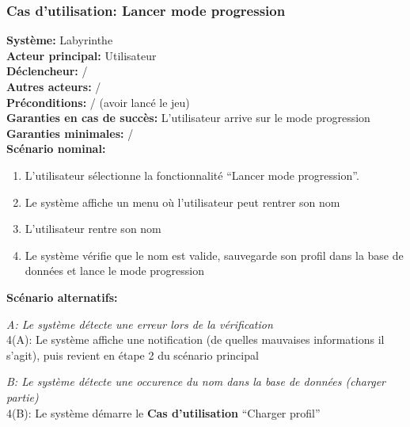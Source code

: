 \documentclass{butexFR}
\begin{document}
\newpage

\subsubsection{Cas d’utilisation: Lancer mode progression}
\textbf{Système:} Labyrinthe\\
\textbf{Acteur principal:} Utilisateur\\
\textbf{Déclencheur:} /\\
\textbf{Autres acteurs:} /\\[0.25em]
\textbf{Préconditions:} / (avoir lancé le jeu)\\
\textbf{Garanties en cas de succès:} L'utilisateur arrive sur le mode progression\\
\textbf{Garanties minimales:} /\\[0.25em]
\textbf{Scénario nominal:}
\begin{enumerate}
    \item L'utilisateur sélectionne la fonctionnalité ``Lancer mode progression''.
    \item Le système affiche un menu où l'utilisateur peut rentrer son nom
    \item L'utilisateur rentre son nom
    \item Le système vérifie que le nom est valide, sauvegarde son profil dans la base de données et lance le mode progression
\end{enumerate}
\textbf{Scénario alternatifs:}

\emph{A: Le système détecte une erreur lors de la vérification}\\
\hspace*{1em}4(A): Le système affiche une notification (de quelles mauvaises informations il s'agit), puis revient en étape 2 du scénario principal

\emph{B: Le système détecte une occurence du nom dans la base de données (charger partie)}\\
\hspace*{1em}4(B): Le système démarre le \textbf{Cas d'utilisation} ``Charger profil''

\newpage
\end{document}
